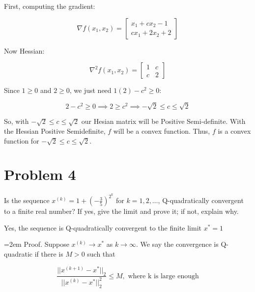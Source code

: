 \documentclass[12pt]{article}
\begin{document}
\vspace{3mm}

First, computing the gradient:

\[ \nabla f(x_{1}, x_{2}) = \left[\begin{array}{r} x_{1} + cx_{2} - 1 \\ cx_{1} + 2x_{2} + 2 \end{array}\right] \]

\vspace{3mm}

Now Hessian:

\[\nabla^{2}f(x_{1}, x_{2}) = \left[\begin{array}{rr} 1 & c \\ c & 2 \end{array}\right]\]

\vspace{3mm} 

Since $ 1 \geq 0$ and $2 \geq 0$, we just need $1(2) - c^{2} \geq 0$:

\[ 2 - c^{2} \geq 0 \implies 2 \geq c^{2} \implies -\sqrt{2} \leq c \leq \sqrt{2} \]

\vspace{3mm}

\noindent So, with $-\sqrt{2} \leq c \leq \sqrt{2}$ our Hesian matrix will be Positive Semi-definite. With the Hessian Positive Semidefinite, $f$ will be a convex function. Thus, $f$ is a convex function for $-\sqrt{2} \leq c \leq \sqrt{2}$.

\newpage

\section*{Problem 4} 

Is the sequence $x^{(k)}=1+(-\frac{3}{5})^{2^k}$ for $k=1,2,\ldots$, Q-quadratically convergent to a finite real number? If yes, give the limit and prove it; if not, explain why.

\vspace{9mm}
\noindent Yes, the sequence is Q-quadratically convergent to the finite limit $x^{*} = 1$
\vspace{9mm}

\hangindent=2em
\noindent Proof. Suppose $x^{(k)} \rightarrow x^{*}$ as $k \rightarrow \infty$. We say the convergence is Q-quadratic if there is $M > 0$ such that 

\[ \frac{||x^{(k+1)} - x^{*}||_{2}}{||x^{(k)} - x^{*}||_{2}^{2}} \leq M, 
\text{ where k is large enough}\]
\end{document}
